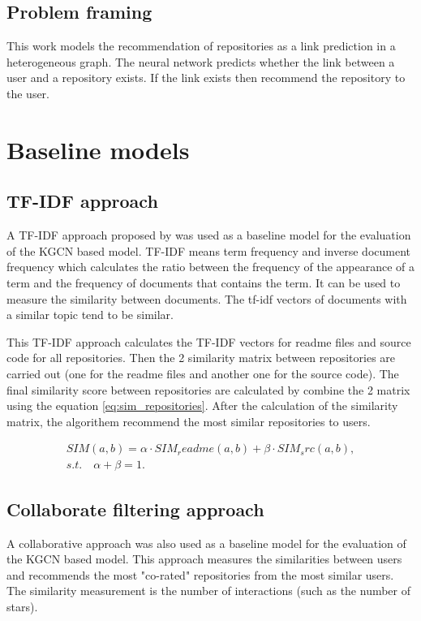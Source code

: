 \documentclass[11pt,twoside]{report}
\begin{document}
\subsection{Problem framing}
This work models the recommendation of repositories as a link prediction in a heterogeneous graph. The neural network predicts whether the link between a user and a repository exists. If the link exists then recommend the repository to the user.

\section{Baseline models}
\subsection{TF-IDF approach}
A TF-IDF approach proposed by \cite{sun_personalized_2018} was used as a baseline model for the evaluation of the KGCN based model. TF-IDF means term frequency and inverse document frequency which calculates the ratio between the frequency of the appearance of a term and the frequency of documents that contains the term. It can be used to measure the similarity between documents. The tf-idf vectors of documents with a similar topic tend to be similar.

This TF-IDF approach calculates the TF-IDF vectors for readme files and source code for all repositories. Then the 2 similarity matrix between repositories are carried out (one for the readme files and another one for the source code). The final similarity score between repositories are calculated by combine the 2 matrix using the equation \ref{eq:sim_repositories}. After the calculation of the similarity matrix, the algorithem recommend the most similar repositories to users.

\begin{gather}
    SIM(a,b)=\alpha\cdot{SIM_readme(a,b)}+\beta\cdot{SIM_src(a,b)}, \\
    s.t.\quad\alpha+\beta=1.
    \label{eq:sim_repositories}
\end{gather}

\subsection{Collaborate filtering approach}
A collaborative approach \cite{guendouz_recommending_2015} was also used as a baseline model for the evaluation of the KGCN based model. This approach measures the similarities between users and recommends the most "co-rated" repositories from the most similar users. The similarity measurement is the number of interactions (such as the number of stars).
\end{document}
